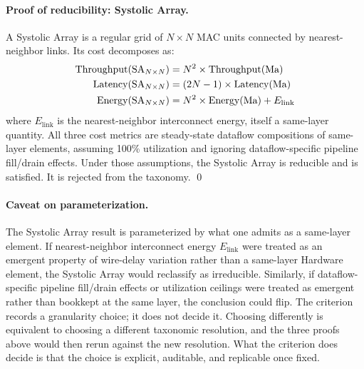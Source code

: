 \paragraph{Proof of reducibility: Systolic Array.} A Systolic Array \citep{kung1982} is a regular grid of $N \times N$ MAC units connected by nearest-neighbor links. Its cost decomposes as:
\begin{align}
\label{eq:systolic-proof}
\text{Throughput}(\text{SA}_{N \times N}) &= N^2 \times \text{Throughput}(\text{Ma}) \\
\text{Latency}(\text{SA}_{N \times N}) &= (2N - 1) \times \text{Latency}(\text{Ma}) \notag \\
\text{Energy}(\text{SA}_{N \times N}) &= N^2 \times \text{Energy}(\text{Ma}) + E_{\text{link}} \notag
\end{align}
where $E_{\text{link}}$ is the nearest-neighbor interconnect energy, itself a same-layer quantity. All three cost metrics are steady-state dataflow compositions of same-layer elements, assuming 100\% utilization and ignoring dataflow-specific pipeline fill/drain effects. Under those assumptions, the Systolic Array is reducible and  is satisfied. It is rejected from the taxonomy. \qed

\paragraph{Caveat on parameterization.} The Systolic Array result is parameterized by what one admits as a same-layer element. If nearest-neighbor interconnect energy $E_{\text{link}}$ were treated as an emergent property of wire-delay variation rather than a same-layer Hardware element, the Systolic Array would reclassify as irreducible. Similarly, if dataflow-specific pipeline fill/drain effects or utilization ceilings were treated as emergent rather than bookkept at the same layer, the conclusion could flip. The criterion records a granularity choice; it does not decide it. Choosing differently is equivalent to choosing a different taxonomic resolution, and the three proofs above would then rerun against the new resolution. What the criterion does decide is that the choice is explicit, auditable, and replicable once fixed.

